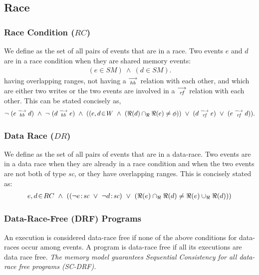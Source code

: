         
    \subsection{Race}
        \subsubsection{Race Condition ($RC$)}
            We define  as the set of all pairs of events that are in a race. Two events $e$ and $d$ are in a race condition when they are shared memory events:
                \begin{align*}
                    (e \in SM)\ \wedge\ (d \in SM).
                \end{align*}
            having overlapping ranges, not having a $\stackrel{\longrightarrow}{_\textit{hb}}$ relation with each other, and which are either two writes or the two events are involved in a $\stackrel{\longrightarrow}{_\textit{rf}}$ relation with each other. This can be stated concisely as,
                \begin{align*}
                    \neg \ (\reln{e}{hb}{d})\ \wedge\ \neg \ (\reln{d}{hb}{e}) 
                    \ \wedge \ 
                     (
                     (\event{e,d}{W}\  \wedge\ (\Re(d) \cap_{\Re} \Re(e) \neq \phi)) 
                          \  \vee\ (d \stck{_\textit{rf}} e)\ \vee\ (e \stck{_\textit{rf}} d)
                    ).
                \end{align*}
                
        \subsubsection{Data Race ($DR$)}
            We define  as the set of all pairs of events that are in a data-race. Two events are in a data race when they are already in a race condition and when the two events are not both of type \textit{sc}, or they have overlapping ranges. This is concisely stated as:  
                \begin{align*}
                    \event{e,d}{RC}  \ \wedge \ 
                    ((\neg\et{e}{sc} \ \vee \ \neg\et{d}{sc}) \ \vee \ 
                    (\Re(e) \cap_{\Re} \Re(d) \neq \Re(e) \cup_{\Re} \Re(d))) 
                \end{align*}

        \subsubsection{Data-Race-Free (DRF) Programs}
            An execution is considered data-race free if none of the above conditions for data-races occur among events. A program is data-race free if all its executions are data race free.          
            \textit{The memory model guarantees Sequential Consistency for all data-race free programs (SC-DRF).}
            